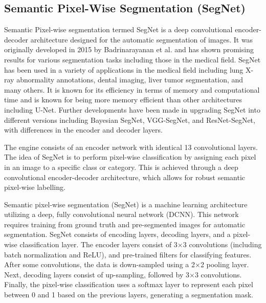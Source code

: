 \subsection{Semantic Pixel-Wise Segmentation (SegNet)}
Semantic Pixel-wise segmentation termed SegNet is a deep convolutional encoder-decoder architecture designed for the automatic segmentation of images. It was originally developed in 2015 by Badrinarayanan et al.\cite{} and has shown promising results for various segmentation tasks including those in the medical field. SegNet has been used in a variety of applications in the medical field including lung X-ray abnormality annotations\cite{}, dental imaging\cite{kwak2020}, liver tumor segmentation\cite{Priyadarsini2022}, and many others. It is known for its efficiency in terms of memory and computational time and is known for being more memory efficient than other architectures including U-Net\cite{Mirzazade2021}. Further developments have been made in upgrading SegNet into different versions including Bayesian SegNet\cite{Dhanagopal2022}, VGG-SegNet\cite{}, and ResNet-SegNet\cite{}, with differences in the encoder and decoder layers.

The engine consists of an encoder network with identical 13 convolutional layers. The idea of SegNet is to perform pixel-wise classification by assigning each pixel in an image to a specific class or category. This is achieved through a deep convolutional encoder-decoder architecture, which allows for robust semantic pixel-wise labelling.

Semantic pixel-wise segmentation (SegNet) is a machine learning architecture utilizing a deep, fully convolutional neural network (DCNN). This network requires training from ground truth and pre-segmented images for automatic segmentation. SegNet consists of encoding layers, decoding layers, and a pixel-wise classification layer. The encoder layers consist of 3$\times$3 convolutions (including batch normalization and ReLU), and pre-trained filters for classifying features. After some convolutions, the data is down-sampled using a 2$\times$2 pooling layer. Next, decoding layers consist of up-sampling, followed by 3$\times$3 convolutions. Finally, the pixel-wise classification uses a softmax layer to represent each pixel between 0 and 1 based on the previous layers, generating a segmentation mask.

